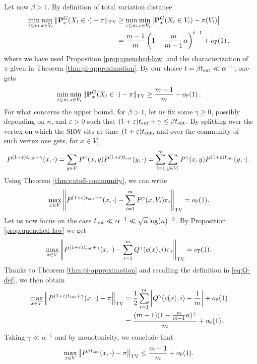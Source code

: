 \documentclass[11pt,oneside]{amsart}
\numberwithin{equation}{section}  %
\theoremstyle{plain}
\newcommand{\p}{\mathbb{P}}
\newcommand{\op}{o_{\p}}
\newcommand{\tv}[1]{\left\|#1\right\|_{\rm TV}}
\newcommand{\tent}{t_{\textup{ent}}}
\newcommand{\quenchG}{\mathbf{P}^G}
\newcommand{\semi}{{Q}}
\begin{document}
Let now $\beta>1$. By definition of total variation distance
\begin{equation} \label{eq:lower-bound-1-alpha}
\begin{split}
	\min_{i \le m}\min_{x\in V_i}\|\quenchG_x(X_t\in\cdot)-\pi\|_{\rm TV} &\ge\min_{i \le m}\min_{x\in V_i}\left| \quenchG_x(X_t\in V_{i})-\pi(V_{i})\right|
	\\
	&= \frac{m-1}{m}\left(1-\frac{m}{m-1}\alpha\right)^{t-1}+\op(1)\,,
\end{split}
\end{equation}
where we have used Proposition \ref{prop:quenched-law} and the characterization of $\pi$ given in Theorem \ref{thm:pi-approximation}. 
By our choice $t=\beta\tent \ll \alpha^{-1}$, one gets
\begin{equation} \label{eq:lower-bound-m-1}
\min_{i \le m}\min_{x\in V_i}\|\quenchG_x(X_t\in\cdot)-\pi\|_{\rm TV} \ge \frac{m-1}{m}-\op(1)\,.
\end{equation}
For what concerns the upper bound, for $\beta>1$, let us fix some $\gamma\ge 0$, possibly depending on $n$, and $\varepsilon>0$ such that $(1+\varepsilon)\tent+\gamma \le \beta\tent$. By splitting over the vertex on which the SRW sits at time $(1+\varepsilon)\tent$, and over the community of such vertex one gets, for $x \in V$,
\begin{equation}\label{eq:1}
	P^{(1+\varepsilon)\tent+\gamma}(x,\cdot)=\sum_{y \in V}P^{\gamma}(x,y)P^{(1+\varepsilon)\tent}(y,\cdot)=\sum_{i=1}^m\sum_{y \in V_i}P^{\gamma}(x,y)P^{(1+\varepsilon)\tent}(y,\cdot)\,.
\end{equation}
Using Theorem \ref{thm:cutoff-community}, we can write
\begin{align}
	\max_{x \in V} 	\tv{ P^{(1+\varepsilon)\tent+\gamma}(x,\cdot)  - \sum_{i=1}^mP^{\gamma}(x,V_i) \pi_i} =\op(1).
\end{align}
Let us now focus on the case $\tent\ll\alpha^{-1} \ll \sqrt{n}\log(n)^{-2}$. By Proposition \ref{prop:quenched-law} we get
\begin{align}\label{eq:439}
	\max_{x \in V} 	\tv {P^{(1+\varepsilon)\tent+\gamma}(x,\cdot) 
		-\sum_{i=1}^m \semi^\gamma(c(x),i) \pi_i} = \op(1).
\end{align}
Thanks to Theorem \ref{thm:pi-approximation} and recalling the definition in \eqref{eq:Q-def}, we then obtain
\begin{equation} \label{eq:gamma}
	\begin{split}
	\max_{x \in V} 	\tv{ {P^{(1+\varepsilon)\tent+\gamma}(x,\cdot) - \pi} }
	&= \frac12\sum_{i=1}^m    \left|\semi^\gamma(c(x),i)-\frac 1m \right|+\op(1)\\
	& =\frac{(m-1)(1-\frac{m}{m-1}\alpha)^{\gamma} }{m}+\op(1).
	\end{split}
\end{equation}
Taking $\gamma\ll\alpha^{-1}$ and by monotonicity, we conclude that 
\begin{equation}  \label{eq:upper-bound-m-1}
	\max_{x \in V} 	\tv{ {P^{\beta\tent}}(x,\cdot) - \pi } \le\frac{m-1}{m}+\op(1).
\end{equation}
\end{document}
